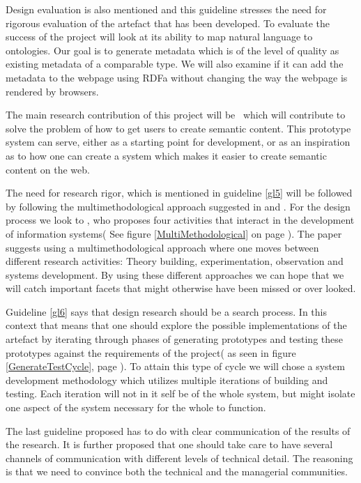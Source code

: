 Design evaluation is also mentioned and this guideline stresses the need for rigorous evaluation of the artefact that has been developed.
To evaluate the success of the project will look at its ability to map natural language to ontologies.
Our goal is to generate metadata which is of the level of quality as existing metadata of a comparable type.
We will also examine if it can add the metadata to the webpage using RDFa without changing the way the webpage is rendered by browsers.

The main research contribution of this project will be \theartefact\,
which will contribute to solve the problem of how to get users to create semantic content.
This prototype system can serve, either as a starting point for development,
or as an inspiration as to how one can create a system which makes it easier to create semantic content on the web.

The need for research rigor, which is mentioned in guideline \ref{gl5} will be followed by following the multimethodological approach suggested in \citet{Chen1990} and \citet{NunamakerJr1990}.
For the design process we look to \citet{Chen1990},
who proposes four activities that interact in the development of information systems( See figure \ref{MultiMethodological} on page \pageref{MultiMethodological}).
The paper suggests using a multimethodological approach where one moves between different research activities:
Theory building, experimentation, observation and systems development.
By using these different approaches we can hope that we will catch important facets that might otherwise have been missed or over looked.

Guideline \ref{gl6} says that design research should be a search process.
In this context that means that one should explore the possible implementations of the artefact by iterating through phases of
generating prototypes and testing these prototypes against the requirements of the project( as seen in figure \ref{GenerateTestCycle},
page \pageref{GenerateTestCycle}).
To attain this type of cycle we will chose a system development methodology which utilizes multiple iterations of building and testing.
Each iteration will not in it self be of the whole system,
but might isolate one aspect of the system necessary for the whole to function.

The last guideline proposed has to do with clear communication of the results of the research.
It is further proposed that one should take care to have several channels of communication with different levels of technical detail.
The reasoning is that we need to convince both the technical and the managerial communities.

